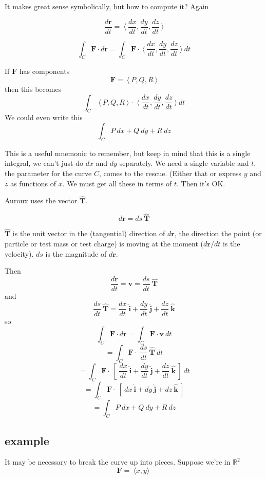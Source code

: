 \documentclass[11pt, oneside]{article}   	%
\begin{document}
It makes great sense symbolically, but how to compute it?  Again

\[\frac{d\mathbf{r}}{dt} = \ \langle \ \frac{dx}{dt},\frac{dy}{dt},\frac{dz}{dt} \ \rangle \]

\[  \int_C \mathbf{F} \cdot d\mathbf{r} =  \int_C \mathbf{F} \cdot \ \langle \ \frac{dx}{dt},\frac{dy}{dt},\frac{dz}{dt} \ \rangle \ dt \]

If $\mathbf{F}$ has components
\[ \mathbf{F} = \ \langle \ P,Q,R \ \rangle \]
then this becomes
\[  \int_C  \ \langle \ P,Q,R \ \rangle \ \cdot \ \langle \ \frac{dx}{dt},\frac{dy}{dt},\frac{dz}{dt} \ \rangle \ dt \]
We could even write this
\[  \int_C  P \ dx + Q \ dy + R \ dz \]

This is a useful mnemonic to remember, but keep in mind that this is a single integral, we can't just do $dx$ and $dy$ separately.  We need a single variable and $t$, the parameter for the curve $C$, comes to the rescue.  (Either that or express $y$ and $z$ as functions of $x$.  We must get all these in terms of $t$.  Then it's OK.

Auroux uses the vector $\mathbf{\hat{T}}$.

\[ d\mathbf{r} = ds \ \hat{\mathbf{T}} \]

$\mathbf{\hat{T}}$ is the unit vector in the (tangential) direction of $d \mathbf{r}$, the direction the point (or particle or test mass or test charge) is moving at the moment ($d \mathbf{r}/dt$ is the velocity).  $ds$ is the magnitude of $d\mathbf{r}$.

Then
\[ \frac{d\mathbf{r}}{dt} = \mathbf{v} = \frac{ds}{dt} \ \hat{\mathbf{T}} \]
and 
\[ \frac{ds}{dt} \ \hat{\mathbf{T}} = \frac{dx}{dt} \ \mathbf{\hat{i}} + \frac{dy}{dt} \ \mathbf{\hat{j}} + \frac{dz}{dt} \ \mathbf{\hat{k}} \]
so
\[  \int_C \mathbf{F} \cdot d\mathbf{r} =  \int_C \mathbf{F} \cdot \mathbf{v} \ dt \]
\[ =  \int_C \mathbf{F} \cdot \ \frac{ds}{dt} \  \mathbf{\hat{T}} \ dt  \]
\[ =  \int_C \mathbf{F} \cdot \ [ \ \frac{dx}{dt} \ \mathbf{\hat{i}} + \frac{dy}{dt} \ \mathbf{\hat{j}} + \frac{dz}{dt} \ \mathbf{\hat{k}} \ ]  \ dt  \]
\[ =  \int_C \mathbf{F} \cdot \ [ \ dx \ \mathbf{\hat{i}} + dy \ \mathbf{\hat{j}} + dz \ \mathbf{\hat{k}} \ ]  \]
\[ = \int_C P \ dx + Q \ dy + R \ dz \]

\subsection*{example}

It may be necessary to break the curve up into pieces.
Suppose we're in $\mathbb{R}^2$ 
\[ \mathbf{F} = \ \langle x,y \rangle \ \]
\end{document}
